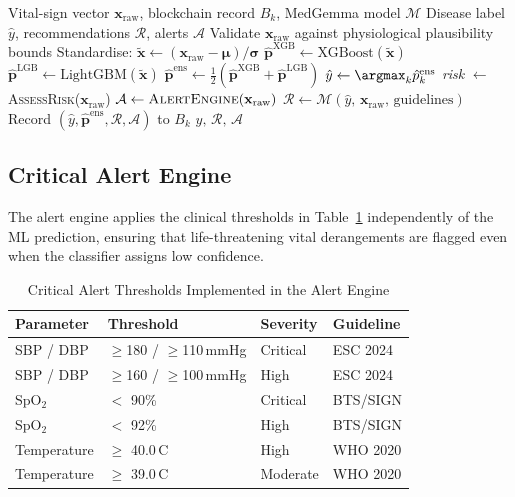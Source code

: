 \documentclass[journal]{IEEEtran}
\newcommand{\GC}{\textsc{GemmaCare}}
\begin{document}
\begin{algorithm}[!t]
\caption{\GC{} Inference Procedure}
\label{alg:inference}
\begin{algorithmic}[1]
\Require Vital-sign vector $\mathbf{x}_{\text{raw}}$, blockchain record $B_k$,
         MedGemma model $\mathcal{M}$
\Ensure  Disease label $\hat{y}$, recommendations $\mathcal{R}$, alerts $\mathcal{A}$
\State Validate $\mathbf{x}_{\text{raw}}$ against physiological plausibility bounds
\State Standardise: $\tilde{\mathbf{x}} \leftarrow (\mathbf{x}_{\text{raw}} - \boldsymbol{\mu}) / \boldsymbol{\sigma}$
\State $\hat{\mathbf{p}}^{\text{XGB}} \leftarrow \text{XGBoost}(\tilde{\mathbf{x}})$
\State $\hat{\mathbf{p}}^{\text{LGB}} \leftarrow \text{LightGBM}(\tilde{\mathbf{x}})$
\State $\hat{\mathbf{p}}^{\text{ens}} \leftarrow \frac{1}{2}(\hat{\mathbf{p}}^{\text{XGB}} + \hat{\mathbf{p}}^{\text{LGB}})$
\State $\hat{y} \leftarrow \argmax_k \hat{p}^{\text{ens}}_k$
\State \textit{risk} $\leftarrow$ \textsc{AssessRisk}($\mathbf{x}_{\text{raw}}$)
\State $\mathcal{A} \leftarrow \textsc{AlertEngine}(\mathbf{x}_{\text{raw}})$
\State $\mathcal{R} \leftarrow \mathcal{M}(\hat{y},\, \mathbf{x}_{\text{raw}},\, \text{guidelines})$
\State Record $(\hat{y}, \hat{\mathbf{p}}^{\text{ens}}, \mathcal{R}, \mathcal{A})$ to $B_k$
\State \Return $\hat{y},\, \mathcal{R},\, \mathcal{A}$
\end{algorithmic}
\end{algorithm}

\subsection{Critical Alert Engine}

The alert engine applies the clinical thresholds in Table~\ref{tab:thresholds}
independently of the ML prediction, ensuring that life-threatening vital
derangements are flagged even when the classifier assigns low confidence.

\begin{table}[!t]
  \centering
  \caption{Critical Alert Thresholds Implemented in the Alert Engine}
  \label{tab:thresholds}
  \renewcommand{\arraystretch}{1.15}
  \begin{tabular}{llll}
    \toprule
    \textbf{Parameter} & \textbf{Threshold} & \textbf{Severity} & \textbf{Guideline} \\
    \midrule
    SBP / DBP & $\geq$180 / $\geq$110\,mmHg & Critical & ESC 2024 \\
    SBP / DBP & $\geq$160 / $\geq$100\,mmHg & High     & ESC 2024 \\
    SpO$_2$   & $<$ 90\%                     & Critical & BTS/SIGN \\
    SpO$_2$   & $<$ 92\%                     & High     & BTS/SIGN \\
    Temperature & $\geq$ 40.0\,\textdegree{}C & High   & WHO 2020 \\
    Temperature & $\geq$ 39.0\,\textdegree{}C & Moderate & WHO 2020 \\
    \bottomrule
  \end{tabular}
\end{table}
\end{document}
